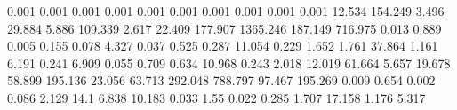 0.001      0.001      %
0.001      0.001      %
0.001      0.001      %
0.001      0.001      %
0.001      0.001      %
12.534     154.249    %
3.496      29.884     %
5.886      109.339    %
2.617      22.409     %
177.907    1365.246   %
187.149    716.975    %
0.013      0.889      %
0.005      0.155      %
0.078      4.327      %
0.037      0.525      %
0.287      11.054     %
0.229      1.652      %
1.761      37.864     %
1.161      6.191      %
0.241      6.909      %
0.055      0.709      %
0.634      10.968     %
0.243      2.018      %
12.019     61.664     %
5.657      19.678     %
58.899     195.136    %
23.056     63.713     %
292.048    788.797    %
97.467     195.269    %
0.009      0.654      %
0.002      0.086      %
2.129      14.1       %
6.838      10.183     %
0.033      1.55       %
0.022      0.285      %
1.707      17.158     %
1.176      5.317      %
